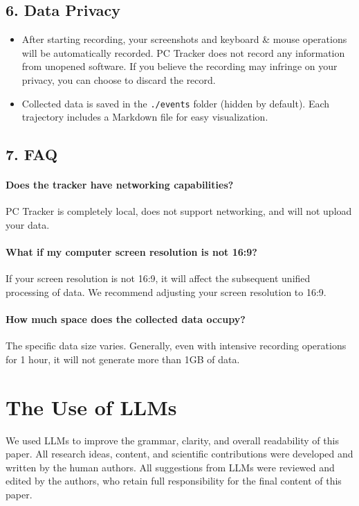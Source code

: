 \documentclass{article} %
\begin{document}
\subsection*{6. Data Privacy}
\begin{itemize}[itemsep=0pt]
    \item After starting recording, your screenshots and keyboard \& mouse operations will be automatically recorded. PC Tracker does not record any information from unopened software. If you believe the recording may infringe on your privacy, you can choose to discard the record.
    \item Collected data is saved in the \texttt{./events} folder (hidden by default). Each trajectory includes a Markdown file for easy visualization.
\end{itemize}

\subsection*{7. FAQ}
\paragraph{Does the tracker have networking capabilities?}  
PC Tracker is completely local, does not support networking, and will not upload your data.

\paragraph{What if my computer screen resolution is not 16:9?}  
If your screen resolution is not 16:9, it will affect the subsequent unified processing of data. We recommend adjusting your screen resolution to 16:9.

\paragraph{How much space does the collected data occupy?}  
The specific data size varies. Generally, even with intensive recording operations for 1 hour, it will not generate more than 1GB of data.

\newpage
\section{The Use of LLMs}
\label{appendix: use of llms}

We used LLMs to improve the grammar, clarity, and overall readability of this paper. All research ideas, content, and scientific contributions were developed and written by the human authors. All suggestions from LLMs were reviewed and edited by the authors, who retain full responsibility for the final content of this paper.
\end{document}
